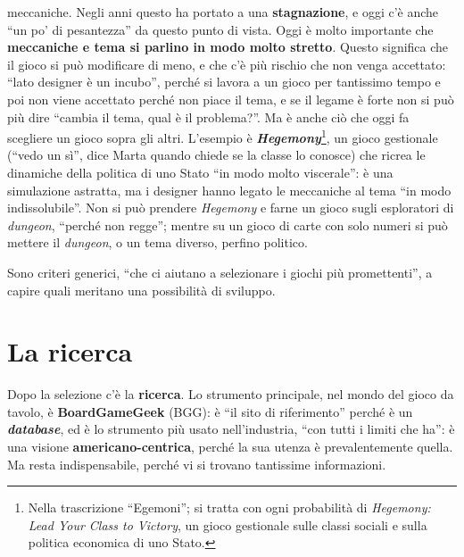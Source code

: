 \begin{itemize}
        meccaniche. Negli anni questo ha portato a una \textbf{stagnazione}, e oggi c'è
        anche ``un po' di pesantezza'' da questo punto di vista. Oggi è molto importante che
        \textbf{meccaniche e tema si parlino in modo molto stretto}. Questo significa che il
        gioco si può modificare di meno, e che c'è più rischio che non venga accettato:
        ``lato designer è un incubo'', perché si lavora a un gioco per tantissimo tempo e
        poi non viene accettato perché non piace il tema, e se il legame è forte non si
        può più dire ``cambia il tema, qual è il problema?''. Ma è anche ciò che oggi fa
        scegliere un gioco sopra gli altri. L'esempio è \textbf{\emph{Hegemony}}\footnote{Nella
        trascrizione ``Egemoni''; si tratta con ogni probabilità di \emph{Hegemony: Lead
        Your Class to Victory}, un gioco gestionale sulle classi sociali e sulla politica
        economica di uno Stato.}, un gioco gestionale (``vedo un sì'', dice Marta quando
        chiede se la classe lo conosce) che ricrea le dinamiche della politica di uno Stato
        ``in modo molto viscerale'': è una simulazione astratta, ma i designer hanno legato
        le meccaniche al tema ``in modo indissolubile''. Non si può prendere \emph{Hegemony}
        e farne un gioco sugli esploratori di \emph{dungeon}, ``perché non regge''; mentre su
        un gioco di carte con solo numeri si può mettere il \emph{dungeon}, o un tema
        diverso, perfino politico.
\end{itemize}
Sono criteri generici, ``che ci aiutano a selezionare i giochi più promettenti'', a capire
quali meritano una possibilità di sviluppo.

\section{La ricerca}
\label{a13:sec:ricerca}



Dopo la selezione c'è la \textbf{ricerca}. Lo strumento principale, nel mondo del gioco da
tavolo, è \textbf{BoardGameGeek} (BGG): è ``il sito di riferimento'' perché è un
\textbf{\emph{database}}, ed è lo strumento più usato nell'industria, ``con tutti i limiti
che ha'': è una visione \textbf{americano-centrica}, perché la sua utenza è prevalentemente
quella. Ma resta indispensabile, perché vi si trovano tantissime informazioni.

